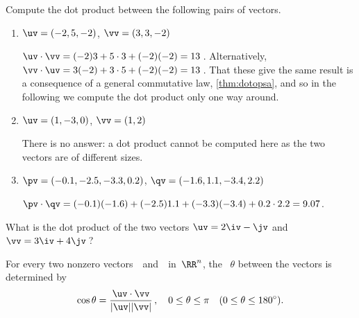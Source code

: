 \begin{example} 
Compute the dot product between the following pairs of vectors.
\begin{enumerate}
\item \(\uv=(-2,5,-2)\), \(\vv=(3,3,-2)\)
\begin{solution} 
\(\uv\cdot\vv=(-2)3+5\cdot3+(-2)(-2)=13\)\,. 
Alternatively, \(\vv\cdot\uv=3(-2)+3\cdot5+(-2)(-2)=13\)\,.
That these give the same result is a consequence of a general commutative law, \cref{thm:dotopsa}, and so in the following we compute the dot product only one way around.
\end{solution}

\item \(\uv=(1,-3,0)\), \(\vv=(1,2)\)
\begin{solution} 
There is no answer: a dot product cannot be computed here as the two vectors are of different sizes. 
\end{solution}


\item \(\pv=(-0.1,-2.5,-3.3,0.2)\), \(\qv=(-1.6,1.1,-3.4,2.2)\)
\begin{solution} 
\(\pv\cdot\qv=(-0.1)(-1.6)+(-2.5)1.1+(-3.3)(-3.4)+0.2\cdot2.2=9.07\).
\end{solution}
\end{enumerate}
\end{example}



\begin{activity}
What is the dot product of the two vectors \(\uv=2\iv-\jv\) and \(\vv=3\iv+4\jv\)\,?
\end{activity}





\begin{theorem} \label{thm:anglev}
For every two nonzero vectors~\uv\ and~\vv\ in~\(\RR^n\),  
the ~\(\theta\) between the vectors is determined by 
\begin{equation*}
\cos\theta=\frac{\uv\cdot\vv}{|\uv||\vv|}\,,
\quad 0\leq\theta\leq\pi
\quad (0\leq\theta\leq180^\circ).
\end{equation*}
\end{theorem}

